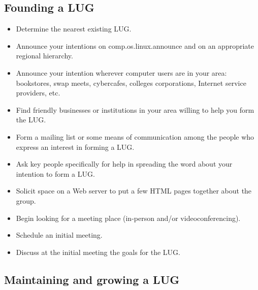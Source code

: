 \documentclass{HOWTO}
\begin{document}
\subsection{Founding a LUG}



\begin{itemize}
\item Determine the nearest existing LUG.
\item Announce your intentions on {\ttfamily comp.os.linux.announce} and on an appropriate regional hierarchy.
\item Announce your intention wherever computer users are in your area: bookstores, swap meets, cybercafes, colleges corporations, Internet service providers, etc.
\item Find friendly businesses or institutions in your area willing to help you form the LUG.
\item Form a mailing list or some means of communication among the people who express an interest in forming a LUG.
\item Ask key people specifically for help in spreading the word about your intention to form a LUG.
\item Solicit space on a Web server to put a few HTML pages together about the group.
\item Begin looking for a meeting place (in-person and/or videoconferencing).
\item Schedule an initial meeting.
\item Discuss at the initial meeting the goals for the LUG.
\end{itemize}





\subsection{Maintaining and growing a LUG}
\end{document}
